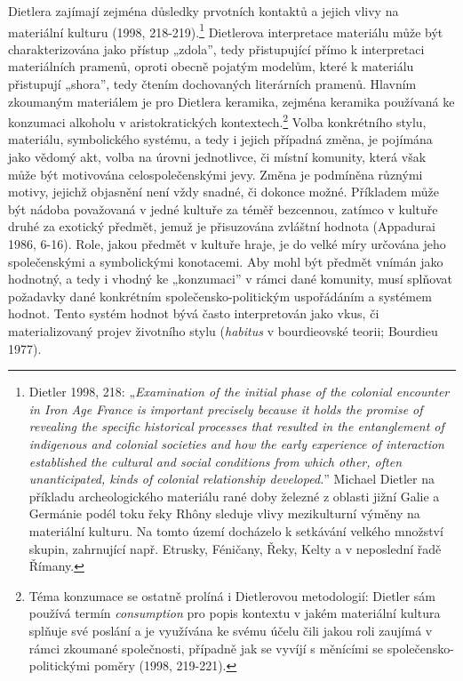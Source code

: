 Dietlera zajímají zejména důsledky prvotních kontaktů a jejich vlivy na materiální kulturu (1998, 218-219).\footnote{Dietler 1998, 218: „{\em Examination of the initial phase of the colonial encounter in Iron Age France is important precisely because it holds the promise of revealing the specific historical processes that resulted in the entanglement of indigenous and colonial societies and how the early experience of interaction established the cultural and social conditions from which other, often unanticipated, kinds of colonial relationship developed.}” Michael Dietler na příkladu archeologického materiálu rané doby železné z oblasti jižní Galie a Germánie podél toku řeky Rhôny sleduje vlivy mezikulturní výměny na materiální kulturu. Na tomto území docházelo k setkávání velkého množství skupin, zahrnující např. Etrusky, Féničany, Řeky, Kelty a v neposlední řadě Římany.} Dietlerova interpretace materiálu může být charakterizována jako přístup „zdola”, tedy přistupující přímo k interpretaci materiálních pramenů, oproti obecně pojatým modelům, které k materiálu přistupují „shora”, tedy čtením dochovaných literárních pramenů. Hlavním zkoumaným materiálem je pro Dietlera keramika, zejména keramika používaná ke konzumaci alkoholu v aristokratických kontextech.\footnote{Téma konzumace se ostatně prolíná i Dietlerovou metodologií: Dietler sám používá termín {\em consumption} pro popis kontextu v jakém materiální kultura splňuje své poslání a je využívána ke svému účelu čili jakou roli zaujímá v rámci zkoumané společnosti, případně jak se vyvíjí s měnícími se společensko-politickými poměry (1998, 219-221).} Volba konkrétního stylu, materiálu, symbolického systému, a tedy i jejich případná změna, je pojímána jako vědomý akt, volba na úrovni jednotlivce, či místní komunity, která však může být motivována celospolečenskými jevy. Změna je podmíněna různými motivy, jejichž objasnění není vždy snadné, či dokonce možné. Příkladem může být nádoba považovaná v jedné kultuře za téměř bezcennou, zatímco v kultuře druhé za exotický předmět, jemuž je přisuzována zvláštní hodnota (Appadurai 1986, 6-16). Role, jakou předmět v kultuře hraje, je do velké míry určována jeho společenskými a symbolickými konotacemi. Aby mohl být předmět vnímán jako hodnotný, a tedy i vhodný ke „konzumaci” v rámci dané komunity, musí splňovat požadavky dané konkrétním společensko-politickým uspořádáním a systémem hodnot. Tento systém hodnot bývá často interpretován jako vkus, či materializovaný projev životního stylu ({\em habitus} v bourdieovské teorii; Bourdieu 1977).

